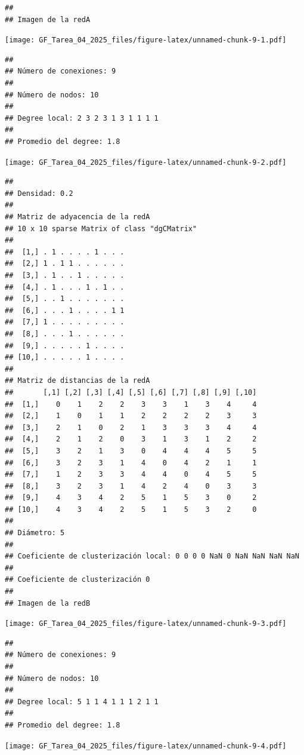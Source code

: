 \documentclass[
]{article}
\begin{document}
\begin{verbatim}
## 
## Imagen de la redA
\end{verbatim}

\texttt{[image: GF\_Tarea\_04\_2025\_files/figure-latex/unnamed-chunk-9-1.pdf]}

\begin{verbatim}
## 
## Número de conexiones: 9 
## 
## Número de nodos: 10 
## 
## Degree local: 2 3 2 3 1 3 1 1 1 1 
## 
## Promedio del degree: 1.8
\end{verbatim}

\texttt{[image: GF\_Tarea\_04\_2025\_files/figure-latex/unnamed-chunk-9-2.pdf]}

\begin{verbatim}
## 
## Densidad: 0.2 
## 
## Matriz de adyacencia de la redA 
## 10 x 10 sparse Matrix of class "dgCMatrix"
##                          
##  [1,] . 1 . . . . 1 . . .
##  [2,] 1 . 1 1 . . . . . .
##  [3,] . 1 . . 1 . . . . .
##  [4,] . 1 . . . 1 . 1 . .
##  [5,] . . 1 . . . . . . .
##  [6,] . . . 1 . . . . 1 1
##  [7,] 1 . . . . . . . . .
##  [8,] . . . 1 . . . . . .
##  [9,] . . . . . 1 . . . .
## [10,] . . . . . 1 . . . .
## 
## Matriz de distancias de la redA 
##       [,1] [,2] [,3] [,4] [,5] [,6] [,7] [,8] [,9] [,10]
##  [1,]    0    1    2    2    3    3    1    3    4     4
##  [2,]    1    0    1    1    2    2    2    2    3     3
##  [3,]    2    1    0    2    1    3    3    3    4     4
##  [4,]    2    1    2    0    3    1    3    1    2     2
##  [5,]    3    2    1    3    0    4    4    4    5     5
##  [6,]    3    2    3    1    4    0    4    2    1     1
##  [7,]    1    2    3    3    4    4    0    4    5     5
##  [8,]    3    2    3    1    4    2    4    0    3     3
##  [9,]    4    3    4    2    5    1    5    3    0     2
## [10,]    4    3    4    2    5    1    5    3    2     0
## 
## Diámetro: 5 
## 
## Coeficiente de clusterización local: 0 0 0 0 NaN 0 NaN NaN NaN NaN 
## 
## Coeficiente de clusterización 0 
## 
## Imagen de la redB
\end{verbatim}

\texttt{[image: GF\_Tarea\_04\_2025\_files/figure-latex/unnamed-chunk-9-3.pdf]}

\begin{verbatim}
## 
## Número de conexiones: 9 
## 
## Número de nodos: 10 
## 
## Degree local: 5 1 1 4 1 1 1 2 1 1 
## 
## Promedio del degree: 1.8
\end{verbatim}

\texttt{[image: GF\_Tarea\_04\_2025\_files/figure-latex/unnamed-chunk-9-4.pdf]}
\end{document}
